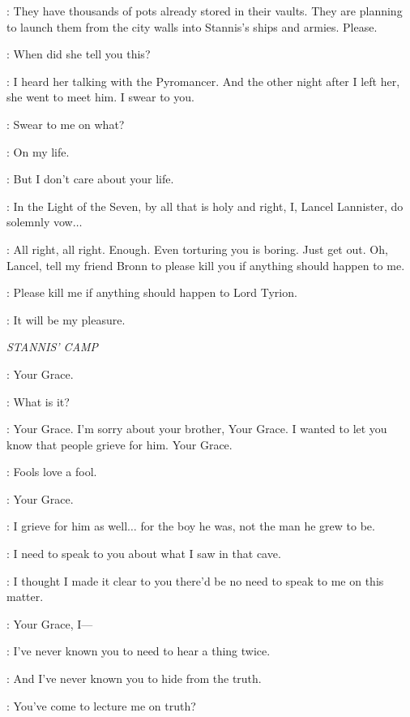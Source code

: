 \LANCEL: They have thousands of pots already stored in their vaults. They are planning to launch them from the city walls into Stannis's ships and armies. Please. 

\TYRION: When did she tell you this? 

\LANCEL: I heard her talking with the Pyromancer. And the other night after I left her, she went to meet him. I swear to you. 

\TYRION: Swear to me on what? 

\LANCEL: On my life. 

\TYRION: But I don't care about your life. 

\LANCEL: In the Light of the Seven, by all that is holy and right, I, Lancel Lannister, do solemnly vow$\ldots$  

\TYRION: All right, all right. Enough. Even torturing you is boring. Just get out. Oh, Lancel, tell my friend Bronn to please kill you if anything should happen to me. 


\LANCEL: Please kill me if anything should happen to Lord Tyrion. 

\BRONN: It will be my pleasure. 


\scene

\textit{STANNIS' CAMP} 


\DAVOS: Your Grace. 

\STANNIS: What is it? 

\DAVOS: Your Grace. I'm sorry about your brother, Your Grace. I wanted to let you know that people grieve for him. Your Grace. 

\STANNIS: Fools love a fool. 

\DAVOS: Your Grace. 

\STANNIS: I grieve for him as well$\ldots$ for the boy he was, not the man he grew to be. 

\DAVOS: I need to speak to you about what I saw in that cave. 

\STANNIS: I thought I made it clear to you there'd be no need to speak to me on this matter. 

\DAVOS: Your Grace, I--- 

\STANNIS: I've never known you to need to hear a thing twice. 

\DAVOS: And I've never known you to hide from the truth. 

\STANNIS: You've come to lecture me on truth? 

